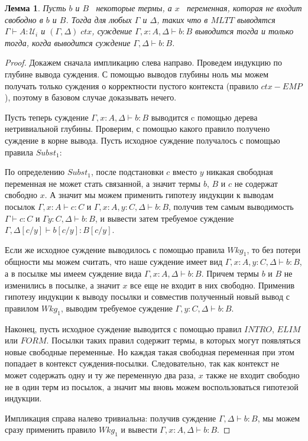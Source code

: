 \documentclass{article}[12pt]
\newtheorem{lemma}{Лемма}
\newcommand{\dash}{\textemdash\ }
\begin{document}
\begin{lemma}
    \label{ContextContractionLemma}
    Пусть $b$ и $B$ \dash некоторые термы, а $x$ \dash переменная, которая не входит свободно в $b$ и $B$. 
    Тогда для любых $\Gamma$ и $\Delta$, таких что в $MLTT$ выводятся $\Gamma \vdash A : \mathcal U_i$ и
    $(\Gamma, \Delta) \; ctx$, суждение $\Gamma, x : A, \Delta \vdash b : B$ выводится тогда и только тогда,
    когда выводится суждение $\Gamma, \Delta \vdash b : B$.
\end{lemma}
\begin{proof}
    Докажем сначала импликацию слева направо. Проведем индукцию по глубине вывода суждения.
    С помощью выводов глубины ноль мы можем получать только суждения о корректности пустого контекста 
    (правило $ctx-EMP$), поэтому в базовом случае доказывать нечего.

    Пусть теперь суждение $\Gamma, x : A, \Delta \vdash b : B$ выводится c помощью дерева нетривиальной глубины.
    Проверим, с помощью какого правило получено суждение в корне вывода.
    Пусть исходное суждение получалось с помощью правила $Subst_1$:
    \begin{prooftree}
    \end{prooftree}
    По определению $Subst_1$, после подстановки $c$ вместо $y$ никакая свободная переменная не может стать
    связанной, а значит термы $b$, $B$ и $c$ не содержат свободно $x$. А значит мы можем применить
    гипотезу индукции к выводам посылок $\Gamma, x : A \vdash c : C$ и $\Gamma, x : A, y : C, \Delta \vdash b : B$,
    получив тем самым выводимость $\Gamma \vdash c : C$ и $\Gamma y : C, \Delta \vdash b : B$,
    и вывести затем требуемое суждение $\Gamma, \Delta[c/y] \vdash b[c/y] : B[c/y]$.

    Если же исходное суждение выводилось с помощью правила
    $Wkg_1$, то без потери общности мы можем считать, что наше суждение имеет вид $\Gamma, x : A, y : C, \Delta \vdash b : B$, а в посылке мы имеем
    суждение вида $\Gamma, x : A, \Delta \vdash b : B$. Причем термы $b$ и $B$ не изменились в посылке,
    а значит $x$ все еще не входит в них свободно. Применив гипотезу индукции к выводу посылки и совместив
    полученный новый вывод с правилом $Wkg_1$, выводим требуемое суждение $\Gamma, y : C, \Delta \vdash b : B$.

    Наконец, пусть исходное суждение выводится с помощью правил $INTRO$, $ELIM$ или $FORM$. Посылки
    таких правил содержит термы, в которых могут появляться новые свободные переменные. Но каждая такая
    свободная переменная при этом попадает в контекст суждения-посылки. Следовательно, так как контекст не может содержать
    одну и ту же переменную два раза, $x$ также не входит свободно не в один терм из посылок, а значит мы
    вновь можем воспользоваться гипотезой индукции.

    Импликация справа налево тривиальна: получив суждение $\Gamma, \Delta \vdash b : B$, мы можем сразу
    применить правило $Wkg_1$ и вывести $\Gamma, x : A, \Delta \vdash b : B$.
\end{proof}
\end{document}
